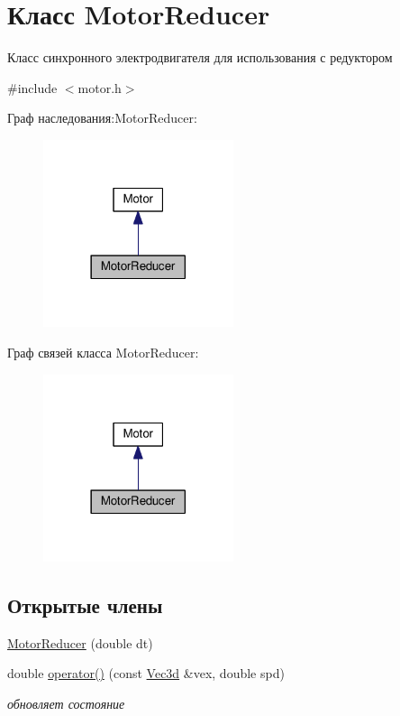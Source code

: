 \hypertarget{classMotorReducer}{}\section{Класс Motor\+Reducer}
\label{classMotorReducer}


Класс синхронного электродвигателя для использования с редуктором  




{\ttfamily \#include $<$motor.\+h$>$}



Граф наследования\+:Motor\+Reducer\+:\nopagebreak
\begin{figure}[H]
\begin{center}
\leavevmode
\includegraphics[width=158pt]{classMotorReducer__inherit__graph}
\end{center}
\end{figure}


Граф связей класса Motor\+Reducer\+:\nopagebreak
\begin{figure}[H]
\begin{center}
\leavevmode
\includegraphics[width=158pt]{classMotorReducer__coll__graph}
\end{center}
\end{figure}
\subsection*{Открытые члены}
\begin{DoxyCompactItemize}
\item 
\hyperlink{classMotorReducer_a85ac4fe9831900c6697ee80ff0cc3d32}{Motor\+Reducer} (double dt)
\item 
double \hyperlink{classMotorReducer_a29141a375c33d409928f40962fcd4011}{operator()} (const \hyperlink{structVec3}{Vec3d} \&vex, double spd)
\begin{DoxyCompactList}\small\item\em обновляет состояние \end{DoxyCompactList}\end{DoxyCompactItemize}


